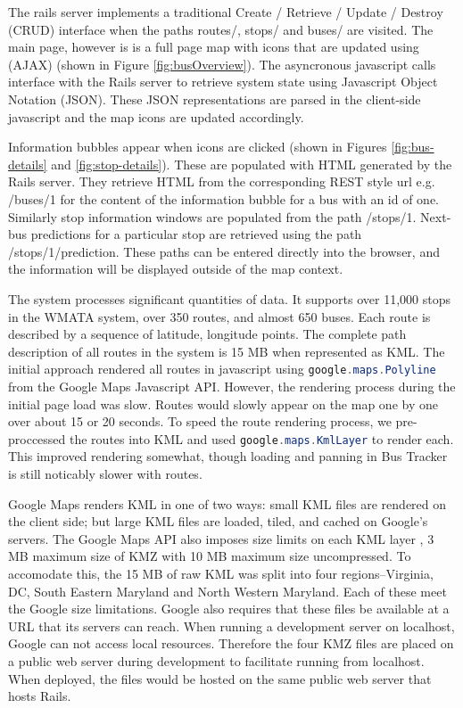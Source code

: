 \documentclass[12pt]{report}
\newcommand{\lstJava}{\lstinline[language=Java,breaklines=true]}
\begin{document}
The rails server implements a traditional Create / Retrieve / Update / Destroy (CRUD) interface when the paths routes/, stops/ and buses/ are visited.  The main page, however is is a full page map with icons that are updated using (AJAX) (shown in Figure \ref{fig:busOverview}).  The asyncronous javascript calls interface with the Rails server to retrieve system state using Javascript Object Notation (JSON).  These JSON representations are parsed in the client-side javascript and the map icons are updated accordingly.

Information bubbles appear when icons are clicked (shown in Figures \ref{fig:bus-details} and \ref{fig:stop-details}).  These are populated with HTML generated by the Rails server.  They retrieve HTML from the corresponding REST style url e.g. /buses/1 for the content of the information bubble for a bus with an id of one.  Similarly stop information windows are populated from the path /stops/1.  Next-bus predictions for a particular stop are retrieved using the path /stops/1/prediction.  These paths can be entered directly into the browser, and the information will be displayed outside of the map context.

The system processes significant quantities of data.  It supports over 11,000 stops in the WMATA system, over 350 routes, and almost 650 buses.  Each route is described by a sequence of latitude, longitude points.  The complete path description of all routes in the system is 15 MB when represented as KML.  The initial approach rendered all routes in javascript using \lstJava|google.maps.Polyline| from the Google Maps Javascript API.  However, the rendering process during the initial page load was slow.  Routes would slowly appear on the map one by one over about 15 or 20 seconds.  To speed the route rendering process, we pre-proccessed the routes into KML and used \lstJava|google.maps.KmlLayer| to render each.  This improved rendering somewhat, though loading and panning in Bus Tracker is still noticably slower with routes.

Google Maps renders KML in one of two ways: small KML files are rendered on the client side; but large KML files are loaded, tiled, and cached on Google's servers.  The Google Maps API also imposes size limits on each KML layer \cite{web:googlekml}, 3 MB maximum size of KMZ with 10 MB maximum size uncompressed.  To accomodate this, the 15 MB of raw KML was split into four regions--Virginia, DC, South Eastern Maryland and North Western Maryland.  Each of these meet the Google size limitations.  Google also requires that these files be available at a URL that its servers can reach.  When running a development server on localhost, Google can not access local resources.  Therefore the four KMZ files are placed on a public web server during development to facilitate running from localhost.  When deployed, the files would be hosted on the same public web server that hosts Rails.
\end{document}
